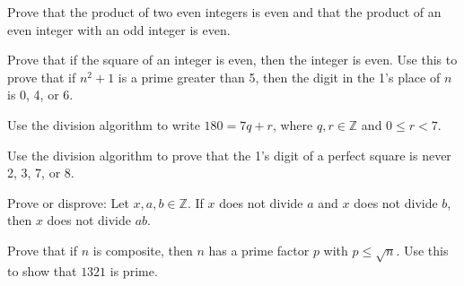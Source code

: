 \documentclass[11pt,letterpaper]{article}
\begin{document}
\homework{}

 Prove that the product of two even integers is even and that the product of an even integer with an odd integer is even. \pspace





\newpage





 Prove that if the square of an integer is even, then the integer is even. Use this to prove that if $n^2 + 1$ is a prime greater than 5, then the digit in the 1's place of $n$ is 0, 4, or 6. \pspace





\newpage





 Use the division algorithm to write $180= 7q + r$, where $q, r \in \mathbb{Z}$ and $0 \leq r < 7$. \pspace





\newpage





 Use the division algorithm to prove that the 1's digit of a perfect square is never 2, 3, 7, or 8. \pspace





\newpage
 
 
 
 

 Prove or disprove: Let $x, a, b \in \mathbb{Z}$. If $x$ does not divide $a$ and $x$ does not divide $b$, then $x$ does not divide $ab$. \pspace





\newpage





 Prove that if $n$ is composite, then $n$ has a prime factor $p$ with $p \leq \sqrt{n}$. Use this to show that $1321$ is prime. \pspace
\end{document}
